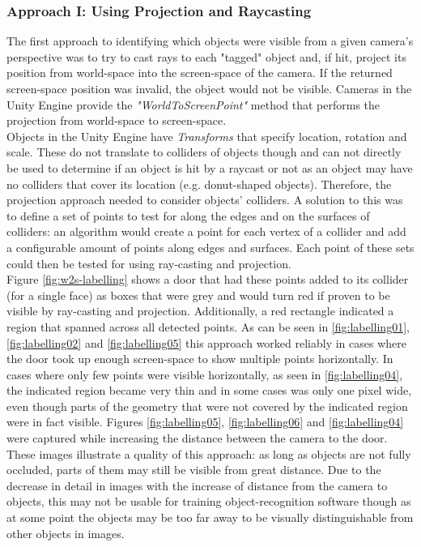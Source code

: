 \subsubsection{Approach I: Using Projection and Raycasting}
The first approach to identifying which objects were visible from a given camera's perspective was to try to cast rays to each "tagged" object and, if hit, project its position from world-space into the screen-space of the camera. If the returned screen-space position was invalid, the object would not be visible. Cameras in the Unity Engine provide the \textit{"WorldToScreenPoint"} \cite{UnityDocsCamera} method that performs the projection from world-space to screen-space.\\
Objects in the Unity Engine have \textit{Transforms} that specify location, rotation and scale. These do not translate to colliders of objects though and can not directly be used to determine if an object is hit by a raycast or not as an object may have no colliders that cover its location (e.g. donut-shaped objects). Therefore, the projection approach needed to consider objects' colliders. A solution to this was to define a set of points to test for along the edges and on the surfaces of colliders: an algorithm would create a point for each vertex of a collider and add a configurable amount of points along edges and surfaces. Each point of these sets could then be tested for using ray-casting and projection.\\
Figure \ref{fig:w2s-labelling} shows a door that had these points added to its collider (for a single face) as boxes that were grey and would turn red if proven to be visible by ray-casting and projection. Additionally, a red rectangle indicated a region that spanned across all detected points. As can be seen in \ref{fig:labelling01}, \ref{fig:labelling02} and \ref{fig:labelling05} this approach worked reliably in cases where the door took up enough screen-space to show multiple points horizontally. In cases where only few points were visible horizontally, as seen in \ref{fig:labelling04}, the indicated region became very thin and in some cases was only one pixel wide, even though parts of the geometry that were not covered by the indicated region were in fact visible. Figures \ref{fig:labelling05}, \ref{fig:labelling06} and \ref{fig:labelling04} were captured while increasing the distance between the camera to the door. These images illustrate a quality of this approach: as long as objects are not fully occluded, parts of them may still be visible from great distance. Due to the decrease in detail in images with the increase of distance from the camera to objects, this may not be usable for training object-recognition software though as at some point the objects may be too far away to be visually distinguishable from other objects in images.\\
